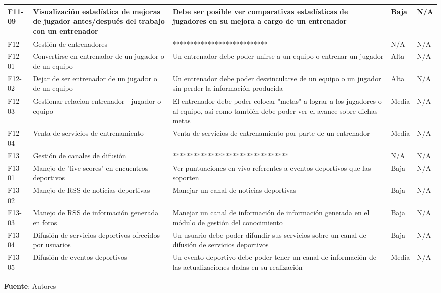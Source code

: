 \begin{table}[!htb]
\begin{center}
\begin{supertabular}{|p{1cm}|p{4cm}|p{4cm}|p{2cm}|p{4cm}|}
			F11-09 & 
			Visualización estadística de mejoras de jugador antes/después del trabajo con un entrenador & 
			Debe ser posible ver comparativas estadísticas de jugadores en su mejora a cargo de un entrenador &
			Baja & 
			N/A \\
			\hline
			F12 & 
			Gestión de entrenadores	&
			*************************** &
			N/A & 
			N/A \\
			\hline
			F12-01 & 
			Convertirse en entrenador de un jugador o de un equipo &
			Un entrenador debe poder unirse a un equipo o entrenar un jugador &
			Alta & 
			N/A \\
			\hline
			F12-02 & 
			Dejar de ser entrenador de un jugador o de un equipo &
			Un entrenador debe poder desvincularse de un equipo o un jugador sin perder la información producida &
			Alta & 
			N/A \\
			\hline
			F12-03 & 
			Gestionar relacion entrenador - jugador o equipo &
			El entrenador debe poder colocar "metas" a lograr a los jugadores o al equipo, así como también debe poder ver el avance sobre dichas metas &
			Media & 
			N/A \\
			\hline
			F12-04 & 
			Venta de servicios de entrenamiento &
			Venta de servicios de entrenamiento por parte de un entrenador &
			Media & 
			N/A \\
			\hline
			F13 & 
			Gestión de canales de difusión	 &
			********************************* &
			N/A & 
			N/A \\
			\hline
			F13-01 & 
			Manejo de "live scores" en encuentros deportivos &
			Ver puntuaciones en vivo referentes a eventos deportivos que las soporten &
			Baja & 
			N/A \\
			\hline
			F13-02 & 
			Manejo de RSS de noticias deportivas &
			Manejar un canal de noticias deportivas &
			Baja & 
			N/A \\
			\hline
			F13-03 & 
			Manejo de RSS de información generada en foros &
			Manejar un canal de información de información generada en el módulo de gestión del conocimiento &
			Baja & 
			N/A \\
			\hline
			F13-04 & 
			Difusión de servicios deportivos ofrecidos por usuarios &
			Un usuario debe poder difundir sus servicios sobre un canal de difusión de servicios deportivos &
			Baja & 
			N/A \\
			\hline
			F13-05 & 
			Difusión de eventos deportivos &
			Un evento deportivo debe poder tener un canal de información de las actualizaciones dadas en su realización &
			Media & 
			N/A \\
			\hline
		\end{supertabular}
		\textbf{Fuente}: Autores
	\end{center}
\end{table}